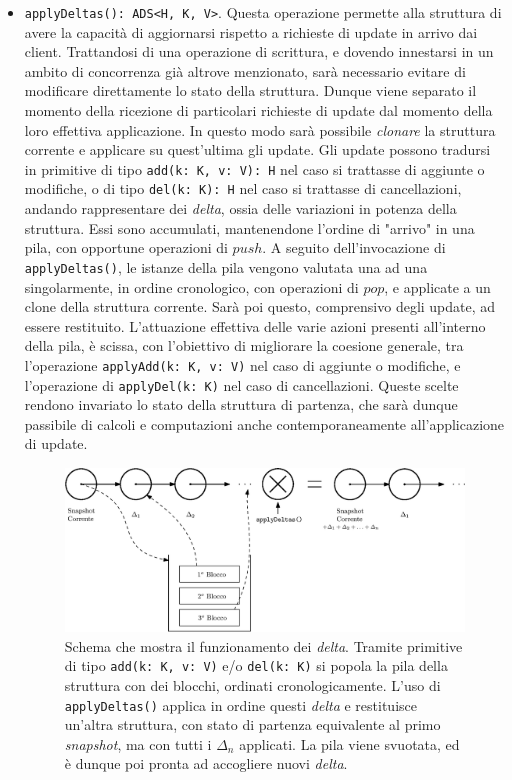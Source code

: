 \begin{itemize}
		\item \verb|applyDeltas(): ADS<H, K, V>|. Questa operazione permette alla struttura di avere la capacità di aggiornarsi rispetto a richieste di update in arrivo dai client. Trattandosi di una operazione di scrittura, e dovendo innestarsi in un ambito di concorrenza già altrove menzionato, sarà necessario evitare di modificare direttamente lo stato della struttura. Dunque viene separato il momento della ricezione di particolari richieste di update dal momento della loro effettiva applicazione. In questo modo sarà possibile \textit{clonare} la struttura corrente e applicare su quest'ultima gli update. Gli update possono tradursi in primitive di tipo \verb|add(k: K, v: V): H| nel caso si trattasse di aggiunte o modifiche, o di tipo \verb|del(k: K): H| nel caso si trattasse di cancellazioni, andando rappresentare dei \textit{delta}, ossia delle variazioni in potenza della struttura. Essi sono accumulati, mantenendone l'ordine di "arrivo" in una pila, con opportune operazioni di $ push $. A seguito dell'invocazione di \verb|applyDeltas()|, le istanze della pila vengono valutata una ad una singolarmente, in ordine cronologico, con operazioni di $ pop $, e applicate a un clone della struttura corrente. Sarà poi questo, comprensivo degli update, ad essere restituito.
		L'attuazione effettiva delle varie azioni presenti all'interno della pila, è scissa, con l'obiettivo di migliorare la coesione generale, tra l'operazione \verb|applyAdd(k: K, v: V)| nel caso di aggiunte o modifiche, e l'operazione di \verb|applyDel(k: K)| nel caso di cancellazioni.
		Queste scelte rendono invariato lo stato della struttura di partenza, che sarà dunque passibile di calcoli e computazioni anche contemporaneamente all'applicazione di update.
				
			\begin{figure}
				\centering
				\includegraphics[scale=0.6]{figure/deltas.eps}
				\caption{Schema che mostra il funzionamento dei \textit{delta}. Tramite primitive di tipo \verb|add(k: K, v: V)| e/o \verb|del(k: K)| si popola la pila della struttura con dei blocchi, ordinati cronologicamente. L'uso di \verb|applyDeltas()| applica in ordine questi \textit{delta} e restituisce un'altra struttura, con stato di partenza equivalente al primo \textit{snapshot}, ma con tutti i $\Delta_{n}$ applicati. La pila viene svuotata, ed è dunque poi pronta ad accogliere nuovi \textit{delta}.}\label{fig:deltas}
			\end{figure}
					

\end{itemize}
